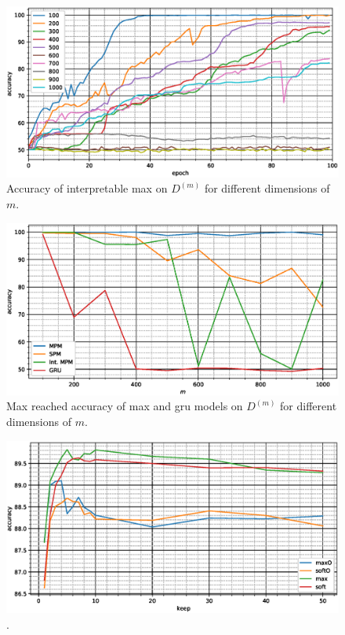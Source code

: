 \begin{figure}
  \centering
  \includegraphics[width=\floatwidth]{imgMax/accuracy-int.eps}
  \caption{Accuracy of interpretable \ac{max} on $D^{(m)}$ for different dimensions of $m$.}
  \label{fig:testAccInt}
\end{figure}
\begin{figure}
  \centering
  \includegraphics[width=\floatwidth]{imgMax/maxBaseDiff.eps}
  \caption{Max reached accuracy of \ac{max} and \ac{gru} models on $D^{(m)}$ for different dimensions of $m$.}
  \label{fig:testAccDiff}
\end{figure}
\begin{figure}
  \centering
  \includegraphics[width=\floatwidth]{img/plotSintex.eps}
  \caption{.}
  \label{fig:sintex}
\end{figure}

